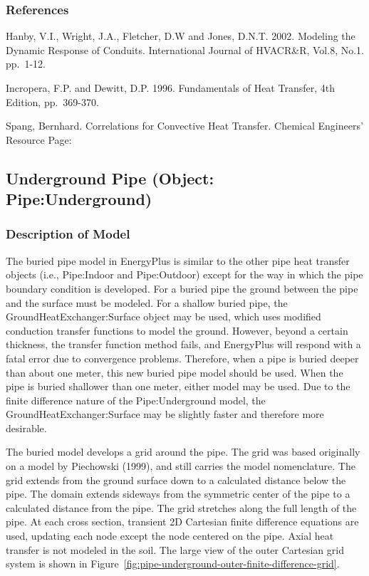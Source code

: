 \subsubsection{References}\label{references-036}

Hanby, V.I., Wright, J.A., Fletcher, D.W and Jones, D.N.T. 2002. Modeling the Dynamic Response of Conduits. International Journal of HVACR\&R, Vol.8, No.1. pp.~1-12.

Incropera, F.P. and Dewitt, D.P. 1996. Fundamentals of Heat Transfer, 4th Edition, pp.~369-370.

Spang, Bernhard. Correlations for Convective Heat Transfer. Chemical Engineers' Resource Page:

\subsection{Underground Pipe (Object: Pipe:Underground)}\label{underground-pipe-object-pipeunderground}

\subsubsection{Description of Model}\label{description-of-model-000}

The buried pipe model in EnergyPlus is similar to the other pipe heat transfer objects (i.e., Pipe:Indoor and Pipe:Outdoor) except for the way in which the pipe boundary condition is developed. For a buried pipe the ground between the pipe and the surface must be modeled. For a shallow buried pipe, the GroundHeatExchanger:Surface object may be used, which uses modified conduction transfer functions to model the ground. However, beyond a certain thickness, the transfer function method fails, and EnergyPlus will respond with a fatal error due to convergence problems. Therefore, when a pipe is buried deeper than about one meter, this new buried pipe model should be used. When the pipe is buried shallower than one meter, either model may be used. Due to the finite difference nature of the Pipe:Underground model, the GroundHeatExchanger:Surface may be slightly faster and therefore more desirable.

The buried model develops a grid around the pipe. The grid was based originally on a model by Piechowski (1999), and still carries the model nomenclature. The grid extends from the ground surface down to a calculated distance below the pipe. The domain extends sideways from the symmetric center of the pipe to a calculated distance from the pipe. The grid stretches along the full length of the pipe. At each cross section, transient 2D Cartesian finite difference equations are used, updating each node except the node centered on the pipe. Axial heat transfer is not modeled in the soil. The large view of the outer Cartesian grid system is shown in Figure~\ref{fig:pipe-underground-outer-finite-difference-grid}.

